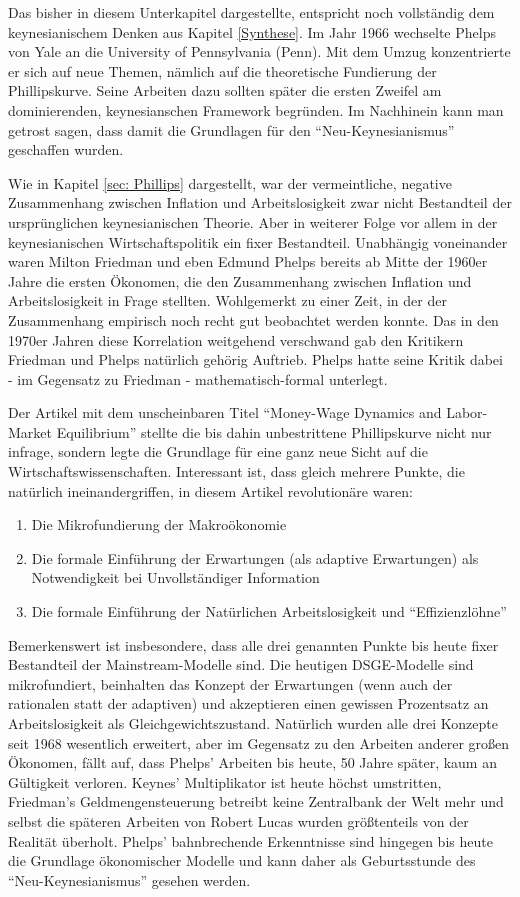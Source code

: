 Das bisher in diesem Unterkapitel dargestellte, entspricht noch vollständig dem keynesianischem Denken aus Kapitel \ref{Synthese}. Im Jahr 1966 wechselte Phelps von Yale an die University of Pennsylvania (Penn). Mit dem Umzug konzentrierte er sich auf neue Themen, nämlich auf die theoretische Fundierung der Phillipskurve. Seine Arbeiten dazu sollten später die ersten Zweifel am dominierenden, keynesianschen Framework begründen. Im Nachhinein kann man getrost sagen, dass damit die Grundlagen für den "`Neu-Keynesianismus"' geschaffen wurden.

Wie in Kapitel \ref{sec: Phillips} dargestellt, war der vermeintliche, negative Zusammenhang zwischen Inflation und Arbeitslosigkeit zwar nicht Bestandteil der ursprünglichen keynesianischen Theorie. Aber in weiterer Folge vor allem in der keynesianischen Wirtschaftspolitik ein fixer Bestandteil. Unabhängig voneinander waren Milton Friedman und eben Edmund Phelps bereits ab Mitte der 1960er Jahre die ersten Ökonomen, die den Zusammenhang zwischen Inflation und Arbeitslosigkeit in Frage stellten. Wohlgemerkt zu einer Zeit, in der der Zusammenhang empirisch noch recht gut beobachtet werden konnte. Das in den 1970er Jahren diese Korrelation weitgehend verschwand gab den Kritikern Friedman und Phelps natürlich gehörig Auftrieb. Phelps hatte seine Kritik dabei - im Gegensatz zu Friedman - mathematisch-formal unterlegt. 

Der Artikel mit dem unscheinbaren Titel "`Money-Wage Dynamics and Labor-Market Equilibrium"' \parencite{Phelps1968} stellte die bis dahin unbestrittene Phillipskurve nicht nur infrage, sondern legte die Grundlage für eine ganz neue Sicht auf die Wirtschaftswissenschaften. Interessant ist, dass gleich mehrere Punkte, die natürlich ineinandergriffen, in diesem Artikel revolutionäre waren:
\begin{enumerate}
\item Die Mikrofundierung der Makroökonomie
\item Die formale Einführung der Erwartungen (als adaptive Erwartungen) als Notwendigkeit bei Unvollständiger Information
\item Die formale Einführung der Natürlichen Arbeitslosigkeit und "`Effizienzlöhne"'
\end{enumerate}
Bemerkenswert ist insbesondere, dass alle drei genannten Punkte bis heute fixer Bestandteil der Mainstream-Modelle sind. Die heutigen DSGE-Modelle sind mikrofundiert, beinhalten das Konzept der Erwartungen (wenn auch der rationalen statt der adaptiven) und akzeptieren einen gewissen Prozentsatz an Arbeitslosigkeit als Gleichgewichtszustand. Natürlich wurden alle drei Konzepte seit 1968 wesentlich erweitert, aber im Gegensatz zu den Arbeiten anderer großen Ökonomen, fällt auf, dass Phelps' Arbeiten bis heute, 50 Jahre später, kaum an Gültigkeit verloren. Keynes' Multiplikator ist heute höchst umstritten, Friedman's Geldmengensteuerung betreibt keine Zentralbank der Welt mehr und selbst die späteren Arbeiten von Robert Lucas wurden größtenteils von der Realität überholt. Phelps' bahnbrechende Erkenntnisse sind hingegen bis heute die Grundlage ökonomischer Modelle und kann daher als Geburtsstunde des "`Neu-Keynesianismus"' gesehen werden.

